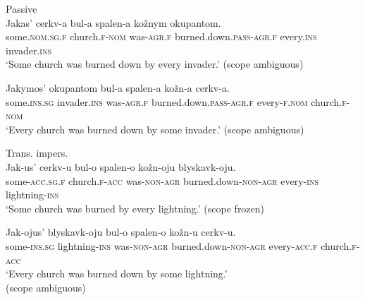 \documentclass[output=paper,colorlinks,citecolor=brown]{langscibook}
\begin{document}
\ea%
    \label{ex:antonyuk:35}

\ea \label{ex:antonyuk:35a}
Passive\\
\gll    Jakas’ cerkv-a     bul-a spalen-a       kožnym okupantom.\\
  some.\textsc{nom.sg.f} church.\textsc{f}-\textsc{nom}   was-\textsc{agr.f} burned.down.\textsc{pass-agr.f}  every.\textsc{ins} invader.\textsc{ins}\\
\glt ‘Some church was burned down by every invader.’    \hfill   (scope ambiguous)

\ex
\gll    Jakymos’ okupantom   bul-a spalen-a       kožn-a cerkv-a.\\
some.\textsc{ins.sg} invader.\textsc{ins}  was-\textsc{agr.f} burned.down.\textsc{pass-agr.f} every-\textsc{f.nom} church.\textsc{f-nom}\\
\glt ‘Every church was burned down by some invader.’  \hfill     (scope ambiguous)\\
    \z
    \z

\ea%
    \label{ex:antonyuk:36}

\ea \label{ex:antonyuk:36a}
 Trans. impers.\\
\gll    Jak-us’ cerkv-u   bul-o spalen-o       kožn-oju blyskavk-oju. \\
  some-\textsc{acc.sg.f} church.\textsc{f-acc}  was-\textsc{non-agr} burned.down-\textsc{non-agr}  every-\textsc{ins} lightning-\textsc{ins}\\
\glt `Some church was burned by every lightning.’     \hfill (scope frozen)

\ex
\gll   Jak-ojus’ blyskavk-oju   bul-o spalen-o       kožn-u cerkv-u.\\
  some-\textsc{ins.sg} lightning-\textsc{ins}    was-\textsc{non-agr} burned.down-\textsc{non-agr}  every-\textsc{acc.f} church.\textsc{f-acc}\\
\glt `Every church was burned down by some lightning.’\\  \hfill    (scope ambiguous)
    \z
    \z
\end{document}
